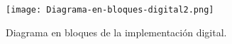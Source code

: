 \begin{figure}[H]
	\centering
	\texttt{[image: Diagrama-en-bloques-digital2.png]}
	\caption{Diagrama en bloques de la implementación digital.}
	\label{fig:diag-en-bloques-digital}
\end{figure}

%


%

